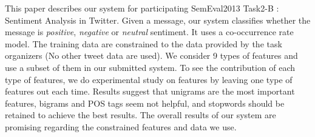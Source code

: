 This paper describes our system for participating SemEval2013 Task2-B \cite{SemEval2013task2}: Sentiment Analysis in Twitter. Given a message, our
 system classifies whether the message is \emph{positive}, \emph{negative} or
 \emph{neutral} sentiment. It uses a co-occurrence rate model. The training data
 are constrained to the data provided by the task organizers (No other tweet
 data are used). We consider 9 types of features and use a subset of them in our
 submitted system. To see the contribution of each type of features, we do
 experimental study on features by leaving one type of features out each time.
 Results suggest that unigrams are the most important features, bigrams and POS
 tags seem not helpful, and stopwords should be retained to achieve the best
 results. The overall results of our system are promising regarding the
 constrained features and data we use.

